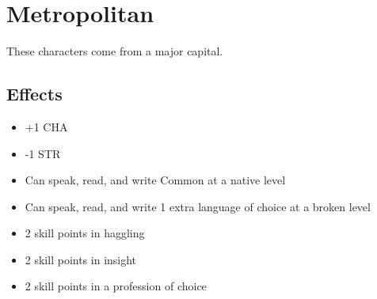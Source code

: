 \section{Metropolitan}\label{culture:metropolitan}
These characters come from a major capital.

\subsection*{Effects}
\begin{itemize}
    \item +1 CHA
    \item -1 STR
    \item Can speak, read, and write Common at a native level
    \item Can speak, read, and write 1 extra language of choice at a broken
        level
    \item 2 skill points in haggling
    \item 2 skill points in insight
    \item 2 skill points in a profession of choice
\end{itemize}
